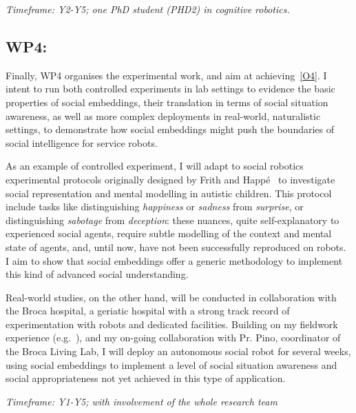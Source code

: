 \vspace{1em}
\noindent\emph{Timeframe: Y2-Y5; one PhD student (PHD2) in cognitive robotics.}

\subsection{WP4: \textbf{\WPD}}

Finally, WP4 organises the experimental work, and aim at achieving~\ref{O4}. I
intent to run both controlled experiments in lab settings to evidence the basic
properties of social embeddings, their translation in terms of social situation awareness,
as well as more complex deployments in real-world, naturalistic settings, to
demonstrate how social embeddings might push the boundaries of social
intelligence for service robots.

As an example of controlled experiment, I will adapt to social
robotics~\cite{lemaignan2015mutual} experimental protocols originally designed
by Frith and Happé~\cite{frith1994autism} to investigate social representation
and mental modelling in autistic children. This protocol include tasks like
distinguishing \emph{happiness} or \emph{sadness} from \emph{surprise}, or
distinguishing \emph{sabotage} from \emph{deception}: these nuances, quite
self-explanatory to experienced social agents, require subtle modelling of the
context and mental state of agents, and, until now, have not been successfully
reproduced on robots. I aim to show that social embeddings offer a generic
methodology to implement this kind of advanced social understanding.

Real-world studies, on the other hand, will be conducted in collaboration with
the Broca hospital, a geriatic hospital with a strong track record of
experimentation with robots and dedicated facilities.  Building on my
fieldwork
experience
(e.g.~\cite{hood2015when,mondada2015ranger,winkle2018social,cooper2023challenges}),
and my on-going collaboration with Pr. Pino, coordinator of the Broca Living Lab, I will
deploy an autonomous social robot for several weeks, using social embeddings to
implement a level of social situation awareness and social appropriateness not yet
achieved in this type of application.

\vspace{1em}
\noindent\emph{Timeframe: Y1-Y5; with involvement of the whole research team}

%
%
%

